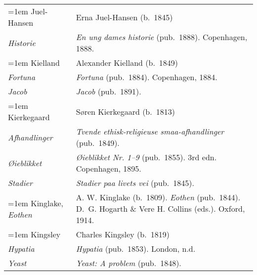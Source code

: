 \begin{xltabular}{\textwidth}{ lQ }
\hangindent=1em  Juel-Hansen & Erna Juel-Hansen (b.~1845)\\
\hspace{1em} \textit{Historie} & \textit{En ung dames historie} (pub.~1888). Copenhagen, 1888. \\

\hangindent=1em  Kielland & Alexander Kielland (b.~1849)\\
\hspace{1em}\textit{Fortuna} & \textit{Fortuna} (pub.~1884). Copenhagen, 1884.\\
\hspace{1em}\textit{Jacob} & \textit{Jacob} (pub.~1891). \\

\hangindent=1em  Kierkegaard & Søren Kierkegaard (b.~1813) \\
\hspace{1em}\textit{Af\-handlinger} & \textit{Tvende ethisk-religieuse smaa-afhandlinger} (pub.~1849). \\
\hspace{1em}\textit{Øieblikket} & \textit{Øieblikket Nr. 1–9} (pub.~1855). 3rd edn. Copenhagen, 1895. \\
\hspace{1em}\textit{Stadier} & \textit{Stadier paa livets vei} (pub.~1845). \\

\hangindent=1em  Kinglake, \textit{Eothen} & A. W. Kinglake (b.~1809). \textit{Eothen} (pub.~1844). D.~G. Hogarth \& Vere H. Collins (eds.). Oxford, 1914. \\

\hangindent=1em  Kingsley & Charles Kingsley (b.~1819) \\
\hspace{1em}\textit{Hypatia} & \textit{Hypatia} (pub.~1853). London, n.d. \\
\hspace{1em}\textit{Yeast} & \textit{Yeast: A problem} (pub.~1848). \\


\end{xltabular}
